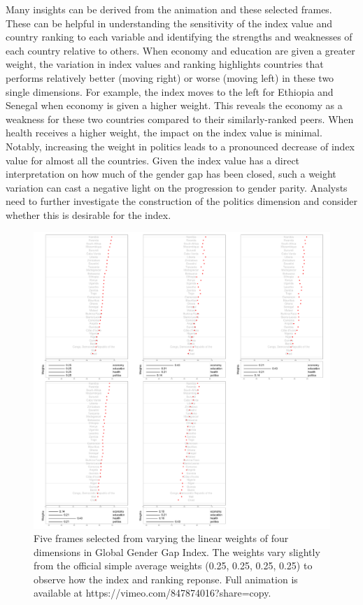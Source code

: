 \documentclass[
]{interact}
\begin{document}
Many insights can be derived from the animation and these selected
frames. These can be helpful in understanding the sensitivity of the
index value and country ranking to each variable and identifying the
strengths and weaknesses of each country relative to others. When
economy and education are given a greater weight, the variation in index
values and ranking highlights countries that performs relatively better
(moving right) or worse (moving left) in these two single dimensions.
For example, the index moves to the left for Ethiopia and Senegal when
economy is given a higher weight. This reveals the economy as a weakness
for these two countries compared to their similarly-ranked peers. When
health receives a higher weight, the impact on the index value is
minimal. Notably, increasing the weight in politics leads to a
pronounced decrease of index value for almost all the countries. Given
the index value has a direct interpretation on how much of the gender
gap has been closed, such a weight variation can cast a negative light
on the progression to gender parity. Analysts need to further
investigate the construction of the politics dimension and consider
whether this is desirable for the index.

\begin{figure}

{\centering \includegraphics{tidyindex_files/figure-pdf/fig-idx-tour-1.pdf}

}

\caption{\label{fig-idx-tour}Five frames selected from varying the
linear weights of four dimensions in Global Gender Gap Index. The
weights vary slightly from the official simple average weights (0.25,
0.25, 0.25, 0.25) to observe how the index and ranking reponse. Full
animation is available at https://vimeo.com/847874016?share=copy.}

\end{figure}
\end{document}
